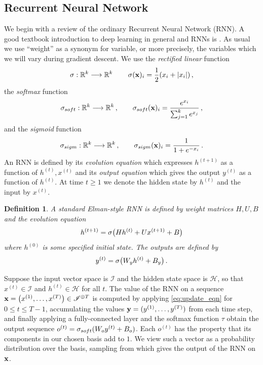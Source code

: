 \documentclass[english,letter paper,12pt,leqno]{article}
\theoremstyle{example}
\newtheorem{definition}[theorem]{Definition}
\numberwithin{equation}{section}
\def\be{\begin{equation}}
\def\ee{\end{equation}}
\begin{document}
\subsection{Recurrent Neural Network}

We begin with a review of the ordinary Recurrent Neural Network (RNN). A good textbook introduction to deep learning in general and RNNs is \cite{dlbook}. As usual we use ``weight'' as a synonym for variable, or more precisely, the variables which we will vary during gradient descent. We use the \emph{rectified linear} function
\be
\relu: \mathbb{R}^k \lto \mathbb{R}^k\, \qquad \relu( \bold{x} )_i = \frac{1}{2}( x_i + |x_i| )\,,
\ee
the \emph{softmax} function
\be
\softmax: \mathbb{R}^k \lto \mathbb{R}^k\,, \qquad \softmax(\bold{x})_i = \frac{e^{x_i}}{\sum_{j=1}^k e^{x_j}}\,,
\ee
and the \emph{sigmoid} function
\be
\sigmoid: \mathbb{R}^k \lto \mathbb{R}^k\,, \qquad
\sigmoid(\bold{x})_i = \frac{1}{1 + e^{-x_i}}\,.
\ee
An RNN is defined by its \emph{evolution equation} which expresses $h^{(t+1)}$ as a function of $h^{(t)}, x^{(t)}$ and its \emph{output equation} which gives the output $y^{(t)}$ as a function of $h^{(t)}$. At time $t \ge 1$ we denote the hidden state by $h^{(t)}$ and the input by $x^{(t)}$. 

\begin{definition} A standard Elman-style RNN \cite{elman} is defined by weight matrices $H, U, B$ and the evolution equation
\be\label{eq:update_eqn}
h^{(t+1)} = \relu\big( H h^{(t)} + U x^{(t+1)} + B\big)
\ee
where $h^{(0)}$ is some specified initial state. The outputs are defined by
\be\label{eq:output_rnn}
y^{(t)} = \relu\big( W_y h^{(t)} + B_y \big)\,.
\ee
\end{definition}
Suppose the input vector space is $\mathscr{I}$ and the hidden state space is $\mathscr{H}$, so that $x^{(t)} \in \mathscr{I}$ and $h^{(t)} \in \mathscr{H}$ for all $t$. The value of the RNN on a sequence $\bold{x} = \big( x^{(1)}, \ldots, x^{(T)} \big) \in \mathscr{I}^{\oplus T}$ is computed by applying \eqref{eq:update_eqn} for $0 \le t \le T - 1$, accumulating the values $\bold{y} = (y^{(1)}, \ldots, y^{(T)})$ from each time step, and finally applying a fully-connected layer and the softmax function $\tau$ obtain the output sequence $o^{(t)} = \sigma_{soft}( W_o y^{(t)} + B_o )$. Each $o^{(t)}$ has the property that its components in our chosen basis add to $1$. We view such a vector as a probability distribution over the basis, sampling from which gives the output of the RNN on $\bold{x}$.
\\
\end{document}
